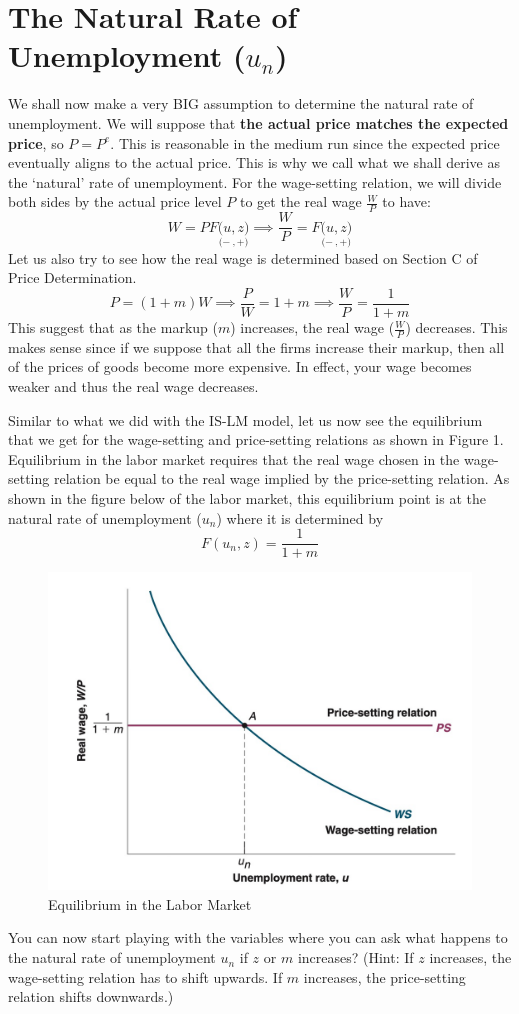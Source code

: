 \documentclass{extarticle}
\begin{document}
\section{The Natural Rate of Unemployment ($u_n$)}
We shall now make a very BIG assumption to determine the natural rate of unemployment. We will suppose that \textbf{the actual price matches the expected price}, so $P = P^e$. This is reasonable in the medium run since the expected price eventually aligns to the actual price. This is why we call what we shall derive as the `natural' rate of unemployment. For the wage-setting relation, we will divide both sides by the actual price level $P$ to get the real wage $\frac{W}{P}$ to have:
$$W = P F\underset{(-}{(u}\underset{, +)}{, z)} \implies \frac{W}{P} = F\underset{(-}{(u}\underset{, +)}{, z)}$$
Let us also try to see how the real wage is determined based on Section C of Price Determination.
$$P = (1+m) W \implies \frac{P}{W} = 1+m \implies \frac{W}{P} = \frac{1}{1+m}$$
This suggest that as the markup ($m$) increases, the real wage ($\frac{W}{P}$) decreases. This makes sense since if we suppose that all the firms increase their markup, then all of the prices of goods become more expensive. In effect, your wage becomes weaker and thus the real wage decreases. 

Similar to what we did with the IS-LM model, let us now see the equilibrium that we get for the wage-setting and price-setting relations as shown in Figure 1. 
Equilibrium in the labor market requires that the real wage chosen in the wage-setting relation be equal to the real wage implied by the price-setting relation. As shown in the figure below of the labor market, this equilibrium point is at the natural rate of unemployment ($u_n$) where it is determined by $$F(u_n, z) = \frac{1}{1+m}$$

\begin{figure}[h]
    \centering 
    \includegraphics[width=0.3\linewidth]{labor market.png} 
    \caption{Equilibrium in the Labor Market} 
    \label{fig:derivation} 
\end{figure}

You can now start playing with the variables where you can ask what happens to the natural rate of unemployment $u_n$ if $z$ or $m$ increases? (Hint: If $z$ increases, the wage-setting relation has to shift upwards. If $m$ increases, the price-setting relation shifts downwards.)
\end{document}
